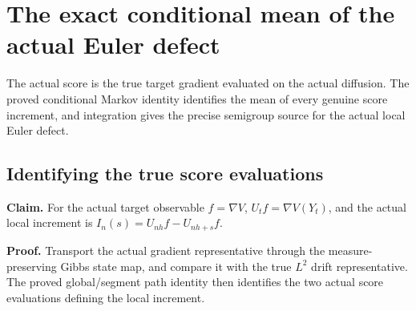 \documentclass[11pt,a4paper]{report}
\begin{document}
\section{\texorpdfstring{The exact conditional mean of the actual Euler defect}{The exact conditional mean of the actual Euler defect}}
\label{proof-module-WassersteinMixing-ActualDefectMean-lean}


The actual score is the true target gradient evaluated on the actual diffusion. The proved conditional Markov identity identifies the mean of every genuine score increment, and integration gives the precise semigroup source for the actual local Euler defect.

\subsection{\texorpdfstring{Identifying the true score evaluations}{Identifying the true score evaluations}}
\label{report-step-WassersteinMixing-ActualDefectMean-lean-1}


\textbf{Claim.} For the actual target observable \(f=\nabla V\), \(U_tf=\nabla V(Y_t)\), and the actual local increment is \(I_n(s)=U_{nh}f-U_{nh+s}f\).



\textbf{Proof.} Transport the actual gradient representative through the measure-preserving Gibbs state map, and compare it with the true \(L^2\) drift representative. The proved global/\allowbreak{}segment path identity then identifies the two actual score evaluations defining the local increment.
\end{document}
